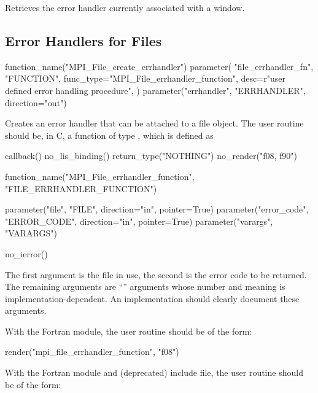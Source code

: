 Retrieves the error handler currently associated with a window.

\subsection{Error Handlers for Files}
\label{subsec:inquiry-errhdlr-files}

%
\begin{mpi-binding}
    function_name("MPI_File_create_errhandler")
    parameter(
        "file_errhandler_fn",
        "FUNCTION",
        func_type="MPI_File_errhandler_function",
        desc=r"user defined error handling procedure",
    )
    parameter("errhandler", "ERRHANDLER", direction="out")
\end{mpi-binding}

Creates an error handler that can be attached to a file object.
The user routine should be, in C, a
function of type
, which is defined as

%
\begin{mpi-binding}
    callback()
    no_lis_binding()
    return_type("NOTHING")
    no_render("f08, f90")
    
    function_name("MPI_File_errhandler_function", "FILE_ERRHANDLER_FUNCTION")
    
    parameter("file", "FILE", direction="in", pointer=True)
    parameter("error_code", "ERROR_CODE", direction="in", pointer=True)
    parameter("varargs", "VARARGS")
    
    no_ierror()
\end{mpi-binding}

The first argument is the file in use, the second
is the error code to be returned.
The remaining arguments are ``'' arguments
whose number and meaning is implementation-dependent.  An implementation
should clearly document these arguments.

\noindent
With the Fortran  module, the user routine  should be of the form:

\begin{mpi-binding}
    render("mpi_file_errhandler_function", "f08")
\end{mpi-binding}

\noindent
With the Fortran  module and (deprecated)  include file,
the user routine  should be of the form:


